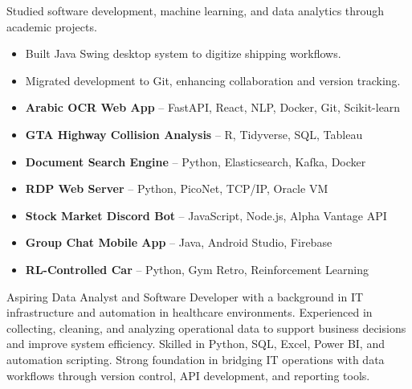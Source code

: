 \documentclass[10pt,a4paper,ragged2e,withhyper]{altacv}
\begin{document}
\begin{paracol}{2}
\divider

 Studied software development, machine learning, and data analytics through academic projects.

\divider

 \begin{itemize} \item Built Java Swing desktop system to digitize shipping workflows. \item Migrated development to Git, enhancing collaboration and version tracking. \end{itemize}


\begin{itemize} \item \textbf{Arabic OCR Web App} – FastAPI, React, NLP, Docker, Git, Scikit-learn \item \textbf{GTA Highway Collision Analysis} – R, Tidyverse, SQL, Tableau \item \textbf{Document Search Engine} – Python, Elasticsearch, Kafka, Docker \item \textbf{RDP Web Server} – Python, PicoNet, TCP/IP, Oracle VM \item \textbf{Stock Market Discord Bot} – JavaScript, Node.js, Alpha Vantage API \item \textbf{Group Chat Mobile App} – Java, Android Studio, Firebase \item \textbf{RL-Controlled Car} – Python, Gym Retro, Reinforcement Learning \end{itemize}

\newpage \switchcolumn

 Aspiring Data Analyst and Software Developer with a background in IT infrastructure and automation in healthcare environments. Experienced in collecting, cleaning, and analyzing operational data to support business decisions and improve system efficiency. Skilled in Python, SQL, Excel, Power BI, and automation scripting. Strong foundation in bridging IT operations with data workflows through version control, API development, and reporting tools.




\end{paracol}
\end{document}
